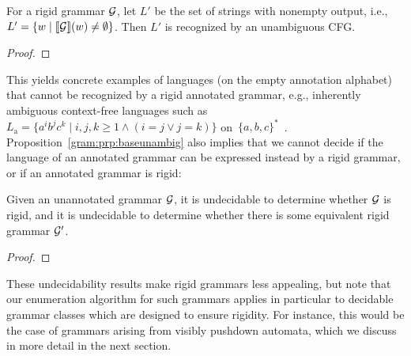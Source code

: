 \begin{proposition}
  \label{gram:prp:baseunambig}
   For a rigid grammar $\mathcal{G}$, let $L'$ be the set of strings with nonempty output, i.e., $L' = \{w \mid {\llbracket{\mathcal{G}}\rrbracket}(w) \not = \emptyset\} $. Then $L'$ is
  recognized by an unambiguous CFG.
\end{proposition}
\begin{proof}
  
\end{proof}

This yields concrete examples of languages (on the empty annotation alphabet) that cannot be recognized by a
rigid annotated grammar, e.g., inherently ambiguous context-free languages
such as $L_\mathrm{a} = \{a^i b^j c^k \mid i, j, k \geq 1 \land (i = j \lor j =
k)\}$ on~$\{a, b, c\}^*$~\cite{maurer1969direct}.
%
%
%
%
Proposition~\ref{gram:prp:baseunambig} also implies that we cannot decide if the language
of an annotated grammar can be expressed instead by a rigid grammar,
or if an annotated grammar is rigid:

\begin{proposition}
  \label{gram:prp:unambundec2}
  Given an unannotated grammar $\mathcal{G}$, it is undecidable to determine whether $\mathcal{G}$
  is rigid, and it is undecidable to determine whether there
  is some equivalent rigid grammar $\mathcal{G}'$.
\end{proposition}
\begin{proof}
  
\end{proof}

These undecidability results make 
rigid grammars less appealing, but note that our enumeration algorithm for such
grammars applies in particular to decidable grammar classes which are
designed to ensure rigidity. For instance, this would be the case
of grammars arising from visibly pushdown automata, which we discuss in more
detail in the next section.

%
%
%
%
%
%
%
%
%
%
%
%
%
%
%

